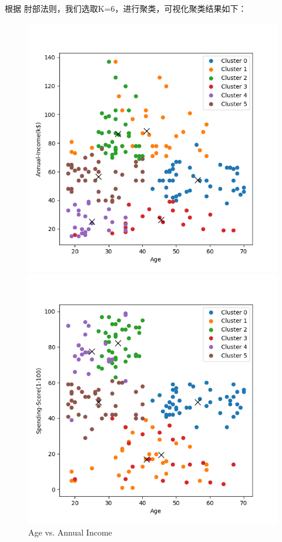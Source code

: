 \documentclass[8pt]{article}
\begin{document}
根据 肘部法则，我们选取K=6，进行聚类，可视化聚类结果如下：

\begin{figure}[H]
    \centering
    \begin{minipage}{0.32\textwidth}
        \centering
        \includegraphics[width=\textwidth]{./Prob4/out/task2_rand14/images/cluster_result_k6_0_1.png}
        \caption{Age vs. Annual Income}
        \label{fig: Age vs. Annual Income k6 pp}
    \end{minipage}
    \hfill
    \begin{minipage}{0.32\textwidth}
        \centering
        \includegraphics[width=\textwidth]{./Prob4/out/task2_rand14/images/cluster_result_k6_0_2.png}

\end{minipage}
\end{figure}
\end{document}
